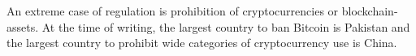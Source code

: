 An extreme case of regulation is prohibition of cryptocurrencies or blockchain-assets. At the time of writing, the largest country to ban Bitcoin is Pakistan and the largest country to prohibit wide categories of cryptocurrency use is China.
 
 



